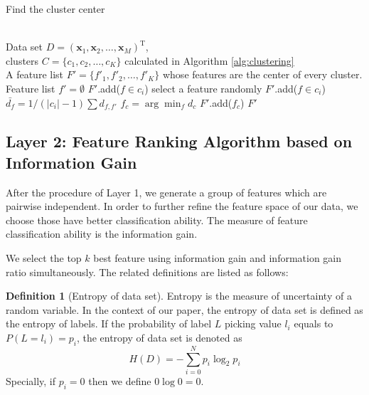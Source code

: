 \documentclass{ieeeaccess}
\theoremstyle{definition}
\newtheorem{defn}{Definition}
\begin{document}
\begin{algorithm}
\caption{Find the cluster center}
\label{alg:find-cluster-center}
\begin{algorithmic}[1]
\REQUIRE ~~\\
    Data set $D=(\bm{x}_1,\bm{x}_2,\ldots,\bm{x}_M)^\text{T}$, \\
    clusters $C=\{c_1, c_2, \ldots, c_K\}$ calculated in Algorithm \ref{alg:clustering}
\ENSURE ~~\\
    A feature list $F'=\{f'_1, f'_2, \ldots, f'_K\}$ whose features are the center of every cluster. 
\STATE Feature list $f'=\emptyset$
        \STATE $F'$.add($f \in c_i$)
            \STATE select a feature randomly
            \STATE $F'$.add($f \in c_i$)
    \ELSE
            \STATE $\bar{d_f}=1/(|c_i|-1)\sum d_{f, f'}$
        \ENDFOR
        \STATE $f_c=\arg\min_f d_c$
        \STATE $F'$.add($f_c$)
    \ENDIF
\ENDFOR
\RETURN $F'$
\end{algorithmic}
\end{algorithm}

\subsection{Layer 2: Feature Ranking Algorithm based on Information Gain}

After the procedure of Layer 1, we generate a group of features which are pairwise independent. In order to further refine the feature space of our data, we choose those have better classification ability. The measure of feature classification ability is the information gain. 

We select the top $k$ best feature using information gain and information gain ratio simultaneously. The related definitions are listed as follows:

\begin{defn}[Entropy of data set]
    Entropy\cite{Shannon1948} is the measure of uncertainty of a random variable. In the context of our paper, the entropy of data set is defined as the entropy of labels. If the probability of label $L$ picking value $l_i$ equals to $P(L=l_i)=p_i$, the entropy of data set is denoted as 
\begin{equation}
    H(D) = -\sum_{i=0}^N p_i \log_2 p_i
\end{equation}
Specially, if $p_i=0$ then we define $0\log0 = 0$. 
\end{defn}
\end{document}
